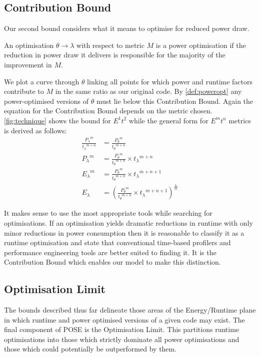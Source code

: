 \subsection{Contribution Bound}
Our second bound considers what it means to optimise for reduced power draw.

\begin{definition}
An optimisation $\theta \to \lambda$ with respect to metric $M$ is a power optimisation if the reduction in power draw it delivers is responsible for the majority of the improvement in $M$.
\label{def:poweropt}
\end{definition}

We plot a curve through $\theta$ linking all points for which power and runtime factors contribute to $M$ in the same ratio as our original code.
By \autoref{def:poweropt} any power-optimised versions of $\theta$ must lie below this Contribution Bound.
Again the equation for the Contribution Bound depends on the metric chosen. 
\autoref{fig:technique} shows the bound for $E^1t^2$ while the general form for $E^mt^n$ metrics is derived as follows:
\begin{align}
\frac{{P_{\lambda}}^m}{{t_{\lambda}}^{m+n}} &= \frac{{P_{\theta}}^m}{{t_{\theta}}^{m+n}} \nonumber \\
 {P_{\lambda}}^m &= \frac{{P_{\theta}}^m}{{t_{\theta}}^{m+n}} \times {t_\lambda}^{m+n} \nonumber \\ 
 {E_{\lambda}}^m &= \frac{{P_{\theta}}^m}{{t_{\theta}}^{m+n}} \times {t_\lambda}^{m+n+1} \nonumber \\ 
  E_{\lambda} &= (\frac{{P_{\theta}}^m}{{t_{\theta}}^{m+n}} \times {t_\lambda}^{m+n+1})^{\frac{1}{m}} 
\end{align}

It makes sense to use the most appropriate tools while searching for optimisations.
If an optimisation yields dramatic reductions in runtime with only minor reductions in power consumption then it is reasonable to classify it as a runtime optimisation and state that conventional time-based profilers and performance engineering tools are better suited to finding it.
It is the Contribution Bound which enables our model to make this distinction.
\subsection{Optimisation Limit}
The bounds described thus far delineate those areas of the Energy/Runtime plane in which runtime and power optimised versions of a given code may exist.
The final component of POSE is the Optimisation Limit.
This partitions runtime optimisations into those which strictly dominate all power optimisations and those which could potentially be outperformed by them.

